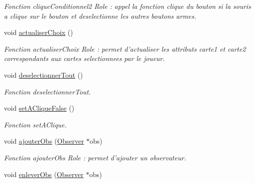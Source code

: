 \begin{DoxyCompactItemize}
\begin{DoxyCompactList}\small\item\em \-Fonction clique\-Conditionnel2 \-Role \-: appel la fonction clique du bouton si la souris a clique sur le bouton et deselectionne les autres boutons armes. \end{DoxyCompactList}\item 
\hypertarget{classFenetreChoix_a870f277efcd181d452893ecb05a8e5dc}{void \hyperlink{classFenetreChoix_a870f277efcd181d452893ecb05a8e5dc}{actualiser\-Choix} ()}\label{classFenetreChoix_a870f277efcd181d452893ecb05a8e5dc}

\begin{DoxyCompactList}\small\item\em \-Fonction actualiser\-Choix \-Role \-: permet d'actualiser les attributs carte1 et carte2 correspondants aux cartes selectionnees par le joueur. \end{DoxyCompactList}\item 
\hypertarget{classFenetreChoix_ac26f3803e0d74d50e979f26061a607d0}{void \hyperlink{classFenetreChoix_ac26f3803e0d74d50e979f26061a607d0}{deselectionner\-Tout} ()}\label{classFenetreChoix_ac26f3803e0d74d50e979f26061a607d0}

\begin{DoxyCompactList}\small\item\em \-Fonction deselectionner\-Tout. \end{DoxyCompactList}\item 
\hypertarget{classFenetreChoix_a7b3cb058960b8c32d02cceaacf0c7d36}{void \hyperlink{classFenetreChoix_a7b3cb058960b8c32d02cceaacf0c7d36}{set\-A\-Clique\-False} ()}\label{classFenetreChoix_a7b3cb058960b8c32d02cceaacf0c7d36}

\begin{DoxyCompactList}\small\item\em \-Fonction set\-A\-Clique. \end{DoxyCompactList}\item 
\hypertarget{classFenetreChoix_a0c446ed2571d5dccc8b2665e6fcbbaee}{void \hyperlink{classFenetreChoix_a0c446ed2571d5dccc8b2665e6fcbbaee}{ajouter\-Obs} (\hyperlink{classObserver}{\-Observer} $\ast$obs)}\label{classFenetreChoix_a0c446ed2571d5dccc8b2665e6fcbbaee}

\begin{DoxyCompactList}\small\item\em \-Fonction ajouter\-Obs \-Role \-: permet d'ajouter un observateur. \end{DoxyCompactList}\item 
\hypertarget{classFenetreChoix_a0ac736f8823d42629849d08ad39f5a60}{void \hyperlink{classFenetreChoix_a0ac736f8823d42629849d08ad39f5a60}{enlever\-Obs} (\hyperlink{classObserver}{\-Observer} $\ast$obs)}\label{classFenetreChoix_a0ac736f8823d42629849d08ad39f5a60}


\end{DoxyCompactItemize}
